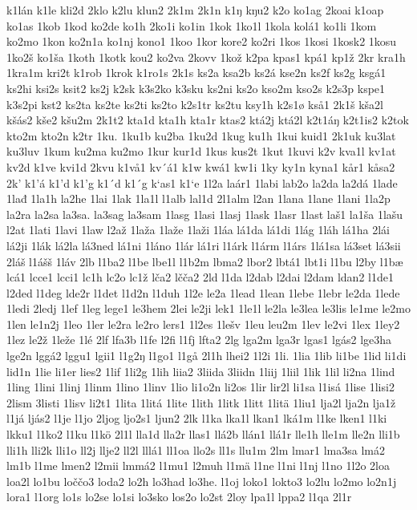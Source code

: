 k1lán
k1le
kli2d
2klo
k2lu
klun2
2k1m
2k1n
k1ŋ
kŋu2
k2o
ko1ag
2koai
k1oap
ko1as
1kob
1kod
ko2de
ko1h
2ko1i
ko1in
1kok
1ko1l
1kola
kolá1
ko1li
1kom
ko2mo
1kon
ko2n1a
ko1nj
kono1
1koo
1kor
kore2
ko2ri
1kos
1kosi
1kosk2
1kosu
1ko2š
ko1ša
1koth
1kotk
kou2
ko2va
2kovv
1kož
k2pa
kpas1
kpá1
kp1ž
2kr
kra1h
1kra1m
kri2t
k1rob
1krok
k1ro1s
2k1s
ks2a
ksa2b
ks2á
kse2n
ks2f
ks2g
ksgá1
ks2hi
ksi2s
ksit2
ks2j
k2sk
k3s2ko
k3sku
ks2ni
ks2o
kso2m
kso2s
k2s3p
kspe1
k3s2pi
kst2
ks2ta
ks2te
ks2ti
ks2to
k2s1tr
ks2tu
ksy1h
k2s1ø
kså1
2k1š
kša2l
kšás2
kše2
kšu2m
2k1t2
kta1d
kta1h
kta1r
ktas2
ktá2j
ktá2l
k2t1áŋ
k2t1is2
k2tok
kto2m
kto2n
k2tr
1ku.
1ku1b
ku2ba
1ku2d
1kug
ku1h
1kui
kuid1
2k1uk
ku3lat
ku3luv
1kum
ku2ma
ku2mo
1kur
kur1d
1kus
kus2t
1kut
1kuvi
k2v
kva1l
kv1at
kv2d
k1ve
kvi1d
2kvu
k1vå1
kv´á1
k1w
kwá1
kw1i
1ky
ky1n
kyna1
kår1
kåsa2
2k'
k1'á
k1'd
k1'g
k1´d
k1´g
k`as1
k1`e
1l2a
laár1
1labi
lab2o
la2da
la2dá
1lade
1lađ
1la1h
la2he
1lai
1lak
1la1l
l1alb
lal1d
2l1alm
l2an
1lana
1lane
1lani
1la2p
la2ra
la2sa
la3sa.
la3sag
la3sam
1lasg
1lasi
1lasj
1lask
1lasr
1last
laš1
la1ša
1lašu
l2at
1lati
1lavi
1law
l2až
1laža
1laže
1laži
1láa
lá1da
lá1di
1lág
1láh
lá1ha
2lái
lá2ji
1lák
lá2la
lá3ned
lá1ni
1láno
1lár
lá1ri
l1árk
l1árm
l1árs
1lá1sa
lá3set
lá3sii
2láš
l1ášš
1láv
2lb
l1ba2
l1be
lbe1l
l1b2m
lbma2
lbor2
lbtá1
lbt1i
l1bu
l2by
l1bæ
lcá1
lcce1
lcci1
lc1h
lc2o
lc1ž
lča2
lčča2
2ld
l1da
l2dab
l2dai
l2dam
ldan2
l1de1
l2ded
l1deg
lde2r
l1det
l1d2n
l1duh
1l2e
le2a
1lead
1lean
1lebe
1lebr
le2da
1lede
1ledi
2ledj
1lef
1leg
lege1
le3hem
2lei
le2ji
lek1
1le1l
le2la
le3lea
le3lis
le1me
le2mo
1len
le1n2j
1leo
1ler
le2ra
le2ro
lers1
1l2es
1lešv
1leu
leu2m
1lev
le2vi
1lex
1ley2
1lez
le2ž
1leže
1lé
2lf
lfa3b
l1fe
l2fi
l1fj
lfta2
2lg
lga2m
lga3r
lgas1
lgás2
lge3ha
lge2n
lggá2
lggu1
lgii1
l1g2ŋ
l1go1
l1gå
2l1h
lhei2
1l2i
1li.
1lia
1lib
li1be
1lid
li1di
lid1n
1lie
li1er
lies2
1lif
1li2g
1lih
liia2
3liida
3liidn
1liij
1liil
1lik
1lil
li2na
1lind
1ling
1lini
1linj
1linm
1lino
1linv
1lio
li1o2n
li2os
1lir
lir2l
li1sa
l1isá
1lise
1lisi2
2lism
3listi
1lisv
li2t1
1lita
1litá
1lite
1lith
1litk
1litt
1litä
1liu1
lja2l
lja2n
lja1ž
l1já
ljás2
l1je
l1jo
2ljog
ljo2s1
ljun2
2lk
l1ka
lka1l
lkan1
lká1m
l1ke
lken1
l1ki
lkku1
l1ko2
l1ku
l1kö
2l1l
lla1d
lla2r
llas1
llá2b
llán1
llá1r
lle1h
lle1m
lle2n
lli1b
lli1h
lli2k
lli1o
ll2j
llje2
ll2l
lllá1
ll1oa
llo2s
ll1s
llu1m
2lm
lmar1
lma3sa
lmá2
lm1b
l1me
lmen2
l2mii
lmmá2
l1mu1
l2muh
l1mä
l1ne
l1ni
l1nj
l1no
1l2o
2loa
loa2l
lo1bu
loččo3
loda2
lo2h
lo3had
lo3he.
l1oj
loko1
lokto3
lo2lu
lo2mo
lo2n1j
lora1
l1org
lo1s
lo2se
lo1si
lo3sko
los2o
lo2st
2loy
lpa1l
lppa2
l1qa
2l1r
